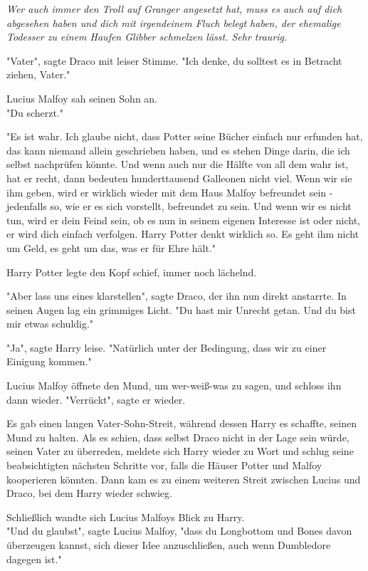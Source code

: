 {\emph{Wer auch immer den Troll auf Granger angesetzt hat, muss es auch auf dich abgesehen haben und dich mit irgendeinem Fluch belegt haben, der ehemalige Todesser zu einem Haufen Glibber schmelzen lässt. Sehr traurig.}

"Vater", sagte Draco mit leiser Stimme. "Ich denke, du solltest es in Betracht ziehen, Vater."

Lucius Malfoy sah seinen Sohn an.\\ "Du scherzt."

"Es ist wahr. Ich glaube nicht, dass Potter seine Bücher einfach nur erfunden hat, das kann niemand allein geschrieben haben, und es stehen Dinge darin, die ich selbst nachprüfen könnte. Und wenn auch nur die Hälfte von all dem wahr ist, hat er recht, dann bedeuten hunderttausend Galleonen nicht viel. Wenn wir sie ihm geben, wird er wirklich wieder mit dem Haus Malfoy befreundet sein - jedenfalls so, wie er es sich vorstellt, befreundet zu sein. Und wenn wir es nicht tun, wird er dein Feind sein, ob es nun in seinem eigenen Interesse ist oder nicht, er wird dich einfach verfolgen. Harry Potter denkt wirklich so. Es geht ihm nicht um Geld, es geht um das, was er für Ehre hält."

Harry Potter legte den Kopf schief, immer noch lächelnd.

"Aber lass uns eines klarstellen", sagte Draco, der ihn nun direkt anstarrte. In seinen Augen lag ein grimmiges Licht. "Du hast mir Unrecht getan. Und du bist mir etwas schuldig."

"Ja", sagte Harry leise. "Natürlich unter der Bedingung, dass wir zu einer Einigung kommen."

Lucius Malfoy öffnete den Mund, um wer-weiß-was zu sagen, und schloss ihn dann wieder. "Verrückt", sagte er wieder.

Es gab einen langen Vater-Sohn-Streit, während dessen Harry es schaffte, seinen Mund zu halten. Als es schien, dass selbst Draco nicht in der Lage sein würde, seinen Vater zu überreden, meldete sich Harry wieder zu Wort und schlug seine beabsichtigten nächsten Schritte vor, falls die Häuser Potter und Malfoy kooperieren könnten. Dann kam es zu einem weiteren Streit zwischen Lucius und Draco, bei dem Harry wieder schwieg.

Schließlich wandte sich Lucius Malfoys Blick zu Harry.\\ "Und du glaubst", sagte Lucius Malfoy, "dass du Longbottom und Bones davon überzeugen kannst, sich dieser Idee anzuschließen, auch wenn Dumbledore dagegen ist."

}
